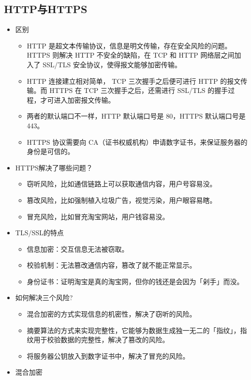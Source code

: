 \documentclass[11pt]{article}
\begin{document}
\subsection{HTTP与HTTPS}
\label{sec:orga0ce98b}
\begin{itemize}
\item 区别
\begin{itemize}
\item HTTP 是超文本传输协议，信息是明文传输，存在安全风险的问题。HTTPS 则解决 HTTP 不安全的缺陷，在 TCP 和 HTTP 网络层之间加入了 SSL/TLS 安全协议，使得报文能够加密传输。
\item HTTP 连接建立相对简单， TCP 三次握手之后便可进行 HTTP 的报文传输。而 HTTPS 在 TCP 三次握手之后，还需进行 SSL/TLS 的握手过程，才可进入加密报文传输。
\item 两者的默认端口不一样，HTTP 默认端口号是 80，HTTPS 默认端口号是 443。
\item HTTPS 协议需要向 CA（证书权威机构）申请数字证书，来保证服务器的身份是可信的。
\end{itemize}
\item HTTPS解决了哪些问题？
\begin{itemize}
\item 窃听风险，比如通信链路上可以获取通信内容，用户号容易没。
\item 篡改风险，比如强制植入垃圾广告，视觉污染，用户眼容易瞎。
\item 冒充风险，比如冒充淘宝网站，用户钱容易没。
\end{itemize}
\item TLS/SSL的特点
\begin{itemize}
\item 信息加密：交互信息无法被窃取。
\item 校验机制：无法篡改通信内容，篡改了就不能正常显示。
\item 身份证书：证明淘宝是真的淘宝网，但你的钱还是会因为「剁手」而没。
\end{itemize}
\item 如何解决三个风险?
\begin{itemize}
\item 混合加密的方式实现信息的机密性，解决了窃听的风险。
\item 摘要算法的方式来实现完整性，它能够为数据生成独一无二的「指纹」，指纹用于校验数据的完整性，解决了篡改的风险。
\item 将服务器公钥放入到数字证书中，解决了冒充的风险。
\end{itemize}
\item 混合加密
\begin{itemize}

\end{itemize}
\end{itemize}
\end{document}
